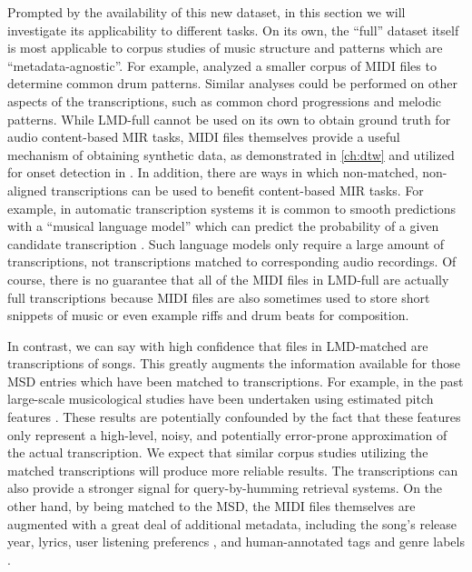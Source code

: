 Prompted by the availability of this new dataset, in this section we will investigate its applicability to different tasks.
On its own, the ``full'' dataset itself is most applicable to corpus studies of music structure and patterns which are ``metadata-agnostic''.
For example, \cite{mauch2012corpus} analyzed a smaller corpus of MIDI files to determine common drum patterns.
Similar analyses could be performed on other aspects of the transcriptions, such as common chord progressions and melodic patterns.
While LMD-full cannot be used on its own to obtain ground truth for audio content-based MIR tasks, MIDI files themselves provide a useful mechanism of obtaining synthetic data, as demonstrated in \cref{ch:dtw} and utilized for onset detection in \cite{bello2005tutorial}.
In addition, there are ways in which non-matched, non-aligned transcriptions can be used to benefit content-based MIR tasks.
For example, in automatic transcription systems it is common to smooth predictions with a ``musical language model'' which can predict the probability of a given candidate transcription \cite{poliner2007discriminative,sigtia2015end}.
Such language models only require a large amount of transcriptions, not transcriptions matched to corresponding audio recordings.
Of course, there is no guarantee that all of the MIDI files in LMD-full are actually full transcriptions because MIDI files are also sometimes used to store short snippets of music or even example riffs and drum beats for composition.

In contrast, we can say with high confidence that files in LMD-matched are transcriptions of songs.
This greatly augments the information available for those MSD entries which have been matched to transcriptions.
For example, in the past large-scale musicological studies have been undertaken using estimated pitch features \cite{serra2012measuring,bertin2010clustering}.
These results are potentially confounded by the fact that these features only represent a high-level, noisy, and potentially error-prone approximation of the actual transcription.
We expect that similar corpus studies utilizing the matched transcriptions will produce more reliable results.
The transcriptions can also provide a stronger signal for query-by-humming retrieval systems.
On the other hand, by being matched to the MSD, the MIDI files themselves are augmented with a great deal of additional metadata, including the song's release year, lyrics, user listening preferencs \cite{jansson2015this}, and human-annotated tags and genre labels \cite{schreiber2015improving}.

